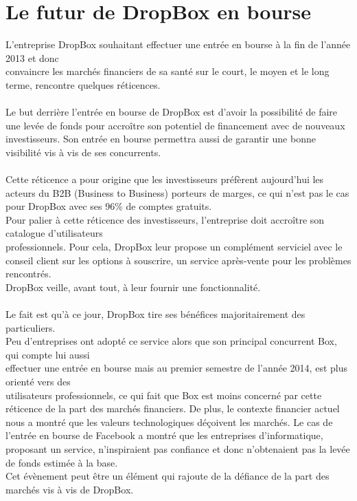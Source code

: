 \documentclass[a4paper, 10pt]{article}
\begin{document}
\section*{Le futur de DropBox en bourse}
L'entreprise DropBox souhaitant effectuer une entr\'ee en bourse \`a la fin de l'ann\'ee 2013 et
donc\\convaincre les march\'es financiers de sa sant\'e sur le court, le moyen et le long terme, rencontre quelques r\'eticences.\\ \\
Le but derri\`ere l'entr\'ee en bourse de DropBox est d'avoir la possibilit\'e de faire une lev\'ee de fonds
pour accro\^itre son potentiel de financement avec de nouveaux investisseurs.
Son entr\'ee en bourse permettra aussi de garantir une bonne visibilit\'e vis \`a vis de ses concurrents.\\ \\
Cette r\'eticence a pour origine que les investisseurs pr\'ef\`erent aujourd'hui les acteurs du B2B (Business to Business) porteurs de marges,
ce qui n'est pas le cas pour DropBox avec ses 96\% de comptes gratuits.\\
Pour palier \`a cette r\'eticence des investisseurs, l'entreprise doit accro\^itre son catalogue d'utilisateurs\\professionnels.
Pour cela, DropBox leur propose un compl\'ement serviciel avec le conseil client sur les options \`a souscrire,
un service apr\`es-vente pour les probl\`emes rencontr\'es.\\
DropBox veille, avant tout, \`a leur fournir une fonctionnalit\'e.\\ \\
Le fait est qu'\`a ce jour, DropBox tire ses b\'en\'efices majoritairement des particuliers.\\
Peu d'entreprises ont adopt\'e ce service alors que son principal concurrent Box,
qui compte lui aussi\\effectuer une entr\'ee en bourse mais au premier semestre de l'ann\'ee 2014,
est plus orient\'e vers des\\utilisateurs professionnels,
ce qui fait que Box est moins concern\'e par cette r\'eticence de la part des march\'es financiers.
\newpage
\noindent
De plus, le contexte financier actuel nous a montr\'e que les valeurs technologiques d\'eçoivent les march\'es.
Le cas de l'entr\'ee en bourse de Facebook a montr\'e que les entreprises d'informatique, proposant un service,
n'inspiraient pas confiance et donc n'obtenaient pas la lev\'ee de fonds estim\'ee \`a la base.\\
Cet \'ev\`enement peut \^etre un \'el\'ement qui rajoute de la d\'efiance de la part des march\'es vis \`a vis de DropBox.
\end{document}
